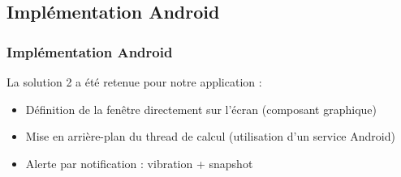 \documentclass{beamer}
\begin{document}

\subsection{Implémentation Android}
 \begin{frame}
   \frametitle{Implémentation Android}
    La solution 2 a été retenue pour notre application :
    \begin{itemize}
    \item Définition de la fenêtre directement sur l'écran (composant
    graphique)
    \item Mise en arrière-plan du thread de calcul (utilisation d'un service
    Android)
    \item Alerte par notification : vibration + snapshot
   \end{itemize}
\end{frame}














\end{document}
